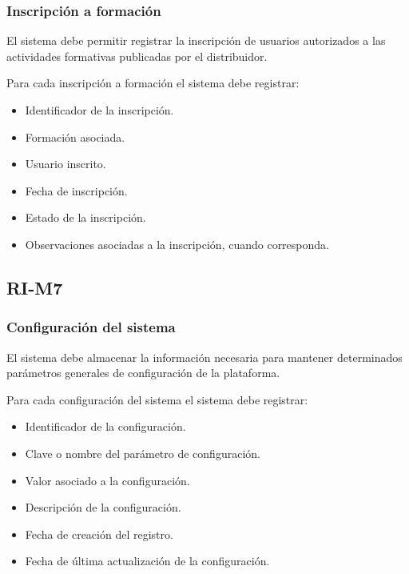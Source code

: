 \subsubsection*{Inscripción a formación}

El sistema debe permitir registrar la inscripción de usuarios autorizados a las actividades formativas publicadas por el distribuidor.

Para cada inscripción a formación el sistema debe registrar:

\begin{itemize}
    \item Identificador de la inscripción.
    \item Formación asociada.
    \item Usuario inscrito.
    \item Fecha de inscripción.
    \item Estado de la inscripción.
    \item Observaciones asociadas a la inscripción, cuando corresponda.
\end{itemize}

\subsection{RI-M7}

\subsubsection*{Configuración del sistema}

El sistema debe almacenar la información necesaria para mantener determinados parámetros generales de configuración de la plataforma.

Para cada configuración del sistema el sistema debe registrar:

\begin{itemize}
    \item Identificador de la configuración.
    \item Clave o nombre del parámetro de configuración.
    \item Valor asociado a la configuración.
    \item Descripción de la configuración.
    \item Fecha de creación del registro.
    \item Fecha de última actualización de la configuración.
\end{itemize}

